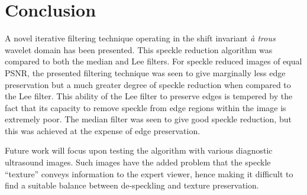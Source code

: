 \documentclass[twocolumn]{article}
\begin{document}
\section{Conclusion}
A novel iterative filtering technique operating in the shift invariant \emph{\`a trous} wavelet
domain has been presented. This speckle reduction algorithm was compared to both the median and
Lee filters. For speckle reduced images of equal PSNR, the presented filtering technique was seen 
to give marginally less edge preservation but a much greater degree of speckle reduction 
when compared to the Lee filter.
This ability of the Lee filter to preserve edges is tempered by the fact that its capacity to remove
speckle from edge regions within the image is extremely poor.
The median filter was seen to give good speckle reduction, but this was achieved at 
the expense of edge preservation.

Future work will focus upon testing the algorithm with various diagnostic ultrasound images. 
Such images have the added problem that 
the speckle ``texture'' conveys information to the expert viewer, hence making it difficult
to find a suitable balance between de-speckling and texture preservation. 
\end{document}
